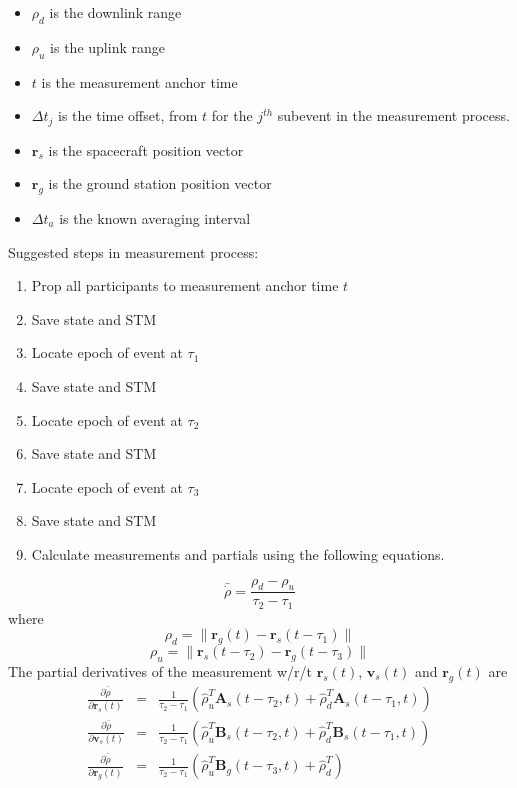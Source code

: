 \documentclass[english]{article}
\begin{document}
\begin{itemize}
   \item $\rho_d$ is the downlink range
   \item $\rho_u$ is the uplink range
   \item $t$ is the measurement anchor time
   \item $\Delta t_j$ is the time offset, from $t$ for the
   $j^{th}$ subevent in the measurement process.
   \item $\mathbf{r}_s$ is the spacecraft position vector
   \item $\mathbf{r}_g$ is the ground station position vector
   \item $\Delta t_a$ is the known averaging interval
\end{itemize}

\begin{Large}Suggested steps in measurement process:\end{Large}
%
\begin{enumerate}
    \item Prop all participants to measurement anchor time $t$
    \item Save state and STM
    \item Locate epoch of event at $\tau_1$
    \item Save state and STM
    \item Locate epoch of event at $\tau_2$
    \item Save state and STM
    \item Locate epoch of event at $\tau_3$
    \item Save state and STM
    \item Calculate measurements and partials using the following
    equations.
\end{enumerate}

\begin{equation}
    \bar{\dot{\rho}} = \frac{\rho_d - \rho_u}{\tau_2 - \tau_1}
\end{equation}
%
where
%
\begin{equation}
    \rho_d = \|\mathbf{r}_g(t)  - \mathbf{r}_s(t - \tau_1)\|
\end{equation}
%
\begin{equation}
    \rho_u = \|\mathbf{r}_s(t - \tau_2)  - \mathbf{r}_g(t - \tau_3)\|
\end{equation}
%
The partial derivatives of the measurement w/r/t $\mathbf{r}_s(t)$,
$\mathbf{v}_s(t)$ and $\mathbf{r}_g(t)$ are
%
\begin{eqnarray}
    \frac{\partial \bar{\dot{\rho}} }{\partial\mathbf{r}_s(t) } &=& \frac{1}{\tau_2 - \tau_1}\left( \hat{\rho}_u^T\mathbf{A}_s(t-\tau_2,t)
    +  \hat{\rho}_d^T\mathbf{A}_s(t-\tau_1,t) \right)\\
    \frac{\partial \bar{\dot{\rho}} }{\partial\mathbf{v}_s(t) } &=& \frac{1}{\tau_2 - \tau_1}\left( \hat{\rho}_u^T\mathbf{B}_s(t-\tau_2,t)
    +  \hat{\rho}_d^T\mathbf{B}_s(t-\tau_1,t) \right)\\
    \frac{\partial \bar{\dot{\rho}} }{\partial\mathbf{r}_g(t) } &=& \frac{1}{\tau_2 - \tau_1}\left( \hat{\rho}_u^T\mathbf{B}_g(t-\tau_3,t)
    +  \hat{\rho}_d^T \right)
\end{eqnarray}
\end{document}
